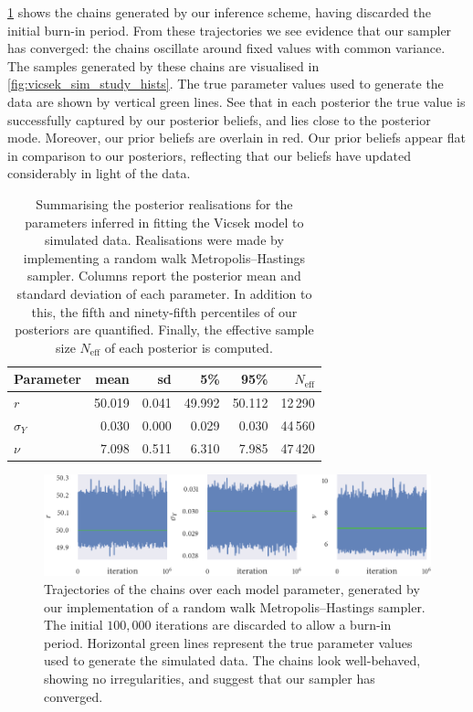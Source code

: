 \cref{fig:vicsek_sim_study_chains} shows the chains generated by our inference scheme,
having discarded the initial burn-in period. From these trajectories we see evidence that
our sampler has converged: the chains oscillate around fixed values with common
variance.  The samples generated by these chains are visualised in
\cref{fig:vicsek_sim_study_hists}.  The true parameter values used to generate the data
are shown by vertical green lines. See that in each posterior the true value is
successfully captured by our posterior beliefs, and lies close to the posterior mode.
Moreover, our prior beliefs are overlain in red. Our prior beliefs appear flat in
comparison to our posteriors, reflecting that our beliefs have updated considerably in
light of the data.
\begin{table}[tb]
  \begin{tabular}{@{}lrrrrr@{}}
    \toprule
    Parameter    & mean   & sd    & 5\%    & 95\%   & $N_{\textrm{eff}}$ \\
    \midrule
    $r$          & 50.019 & 0.041 & 49.992 & 50.112 & 12\,290            \\
    $\sigma_{Y}$ & 0.030  & 0.000 & 0.029  & 0.030  & 44\,560            \\
    $\nu$        & 7.098  & 0.511 & 6.310  & 7.985  & 47\,420            \\
    \bottomrule
  \end{tabular}
  \caption{Summarising the posterior realisations for the parameters inferred in fitting the
    Vicsek model to simulated data. Realisations were made by implementing a random walk
    Metropolis--Hastings sampler. Columns report the posterior mean and standard deviation
    of each parameter. In addition to this, the fifth and ninety-fifth percentiles of our
    posteriors are quantified. Finally, the effective sample size $N_{\textrm{eff}}$ of
    each posterior is computed.}
  \label{tab:vicsek_sim_study_summary}
\end{table}
\begin{figure}[tb]
  \includegraphics{mh_r_trace.pdf}
  \caption{Trajectories of the chains over each model parameter, generated by our
      implementation of a random walk Metropolis--Hastings sampler. The initial $100,000$
      iterations are discarded to allow a burn-in period. Horizontal green lines represent
      the true parameter values used to generate the simulated data. The chains look
      well-behaved, showing no irregularities, and suggest that our sampler has converged.}
  \label{fig:vicsek_sim_study_chains}
\end{figure}
